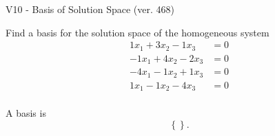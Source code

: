 \begin{exercise}
  \begin{exerciseTitle}V10 - Basis of Solution Space (ver. 468)\end{exerciseTitle}
  \begin{exerciseStatement}
    Find a basis for the solution space of the homogeneous system 
\begin{align*}
 1 x_ 1 + 3 x_ 2 -1 x_ 3 &= 0  \\ 
  -1 x_ 1 + 4 x_ 2 -2 x_ 3 &= 0  \\ 
  -4 x_ 1 -1 x_ 2 + 1 x_ 3 &= 0  \\ 
  1 x_ 1 -1 x_ 2 -4 x_ 3 &= 0  \\ 
 \end{align*}


 
  \end{exerciseStatement}

  \begin{exerciseAnswer}
   A basis is   
\[\left\{\right\}.\]

  


  \end{exerciseAnswer}
\end{exercise}